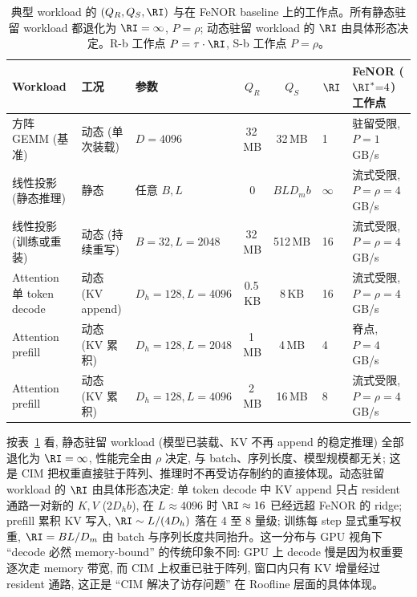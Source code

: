 \begin{table}[H]
\centering
\small
\renewcommand{\arraystretch}{1.2}
\setlength{\tabcolsep}{4pt}
\begin{tabular}{@{} p{} p{} p{} c c p{} p{} @{}}
\toprule
\textbf{Workload} & \textbf{工况} & \textbf{参数} & \textbf{$Q_R$} & \textbf{$Q_S$} & \textbf{$\RI$} & \textbf{FeNOR ($\RI^{*}{=}4$) 工作点} \\
\midrule
方阵 GEMM (基准)         & 动态 (单次装载) & $D = 4096$           & 32\,MB  & 32\,MB  & 1     & 驻留受限, $P = 1$\,GB/s \\
线性投影 (静态推理)      & 静态           & 任意 $B, L$           & 0       & $BLD_m b$ & $\infty$ & 流式受限, $P = \rho = 4$\,GB/s \\
线性投影 (训练或重装)    & 动态 (持续重写) & $B = 32, L = 2048$    & 32\,MB  & 512\,MB & 16    & 流式受限, $P = \rho = 4$\,GB/s \\
Attention 单 token decode & 动态 (KV append) & $D_h = 128, L = 4096$ & 0.5\,KB & 8\,KB   & 16    & 流式受限, $P = \rho = 4$\,GB/s \\
Attention prefill         & 动态 (KV 累积)  & $D_h = 128, L = 2048$ & 1\,MB   & 4\,MB   & 4     & 脊点, $P = 4$\,GB/s \\
Attention prefill         & 动态 (KV 累积)  & $D_h = 128, L = 4096$ & 2\,MB   & 16\,MB  & 8     & 流式受限, $P = \rho = 4$\,GB/s \\
\bottomrule
\end{tabular}
\caption{典型 workload 的 $(Q_R, Q_S, \RI)$ 与在 FeNOR baseline 上的工作点。所有静态驻留 workload 都退化为 $\RI = \infty$, $P = \rho$; 动态驻留 workload 的 $\RI$ 由具体形态决定。R-b 工作点 $P = \tau \cdot \RI$, S-b 工作点 $P = \rho$。}
\label{tab:wl_calibration}
\end{table}

按表~\ref{tab:wl_calibration} 看, 静态驻留 workload (模型已装载、KV 不再 append 的稳定推理) 全部退化为 $\RI = \infty$, 性能完全由 $\rho$ 决定, 与 batch、序列长度、模型规模都无关; 这是 CIM 把权重直接驻于阵列、推理时不再受访存制约的直接体现。动态驻留 workload 的 $\RI$ 由具体形态决定: 单 token decode 中 KV append 只占 resident 通路一对新的 $K, V$ ($2 D_h b$), 在 $L \approx 4096$ 时 $\RI \approx 16$ 已经远超 FeNOR 的 ridge; prefill 累积 KV 写入, $\RI \sim L/(4 D_h)$ 落在 4 至 8 量级; 训练每 step 显式重写权重, $\RI = BL/D_m$ 由 batch 与序列长度共同抬升。这一分布与 GPU 视角下 “decode 必然 memory-bound” 的传统印象不同: GPU 上 decode 慢是因为权重要逐次走 memory 带宽, 而 CIM 上权重已驻于阵列, 窗口内只有 KV 增量经过 resident 通路, 这正是 “CIM 解决了访存问题” 在 Roofline 层面的具体体现。

